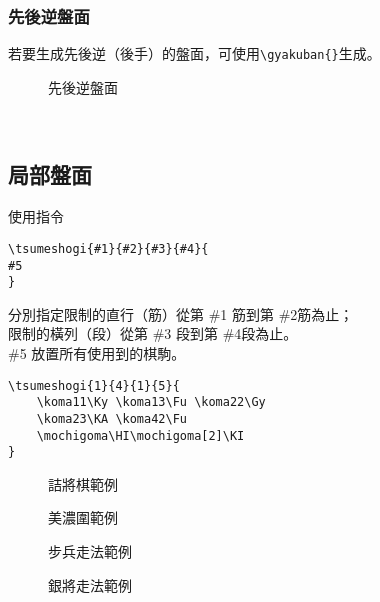 \subsubsection{先後逆盤面}
若要生成先後逆（後手）的盤面，可使用\verb|\gyakuban{}|生成。\\
\begin{figure}[h]
    \centering
    \caption{先後逆盤面}
    \label{fig:my_label}
\end{figure}\\

\subsection{局部盤面}
使用指令
\begin{lstlisting}
\tsumeshogi{#1}{#2}{#3}{#4}{
#5
}
\end{lstlisting}
分別指定限制的直行（筋）從第 \#1 筋到第 \#2筋為止；\\
限制的橫列（段）從第 \#3 段到第 \#4段為止。\\
\#5 放置所有使用到的棋駒。
\begin{lstlisting}
\tsumeshogi{1}{4}{1}{5}{
    \koma11\Ky \koma13\Fu \koma22\Gy
    \koma23\KA \koma42\Fu
    \mochigoma\HI\mochigoma[2]\KI
}
\end{lstlisting}

\begin{figure}[h]
  \begin{minipage}[h]{0.5\linewidth}
    \centering
    \caption{詰將棋範例}
    \label{fig:side:a}
  \end{minipage}%
  \begin{minipage}[h]{0.5\linewidth}
    \centering
    \caption{美濃圍範例}
    \label{fig:side:b}
  \end{minipage}
\end{figure}

\newpage

\begin{figure}[h]
  \begin{minipage}[h]{0.5\linewidth}
    \centering
    \caption{步兵走法範例}
    \label{fig:side:a}
  \end{minipage}%
  \begin{minipage}[h]{0.5\linewidth}
    \centering
    \caption{銀將走法範例}
    \label{fig:side:b}
  \end{minipage}
\end{figure}


  
    
  